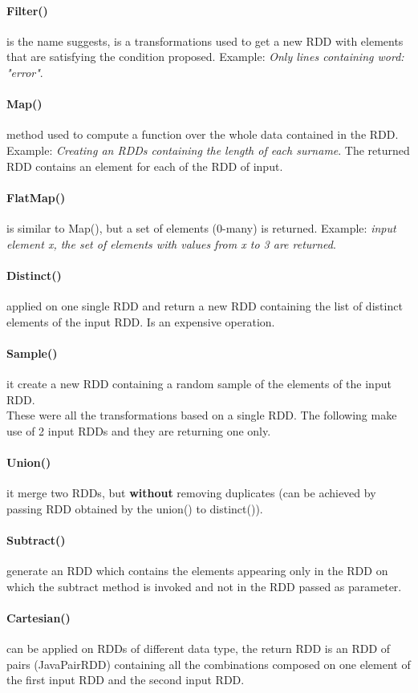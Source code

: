 \documentclass[12pt]{article}
\begin{document}
\paragraph{Filter()} is the name suggests, is a transformations used to get a new RDD with elements that are satisfying the condition proposed. Example: \textit{Only lines containing word: "error"}.
\paragraph{Map()} method used to compute a function over the whole data contained in the RDD. Example: \textit{Creating an RDDs containing the length of each surname}. The returned RDD contains an element for each of the RDD of input. \paragraph{FlatMap()} is similar to Map(), but a set of elements (0-many) is returned. Example: \textit{input element x, the set of elements with values from x to 3 are returned}.
\paragraph{Distinct()} applied on one single RDD and return a new RDD containing the list of distinct elements of the input RDD. Is an expensive operation.
\paragraph{Sample()} it create a new RDD containing a random sample of the elements of the input RDD.\\
These were all the transformations based on a single RDD. The following make use of 2 input RDDs and they are returning one only.
\paragraph{Union()} it merge two RDDs, but \textbf{without} removing duplicates (can be achieved by passing RDD obtained by the union() to distinct()).
\paragraph{Subtract()} generate an RDD which contains the elements appearing only in the RDD on which the subtract method is invoked and not in the RDD passed as parameter.
\paragraph{Cartesian()} can be applied on RDDs of different data type, the return RDD is an RDD of pairs (JavaPairRDD) containing all the combinations composed on one element of the first input RDD and the second input RDD.
\end{document}
